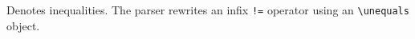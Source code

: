 
Denotes inequalities. The parser rewrites an infix \verb|!=| operator
using an \verb|\unequals| object.




